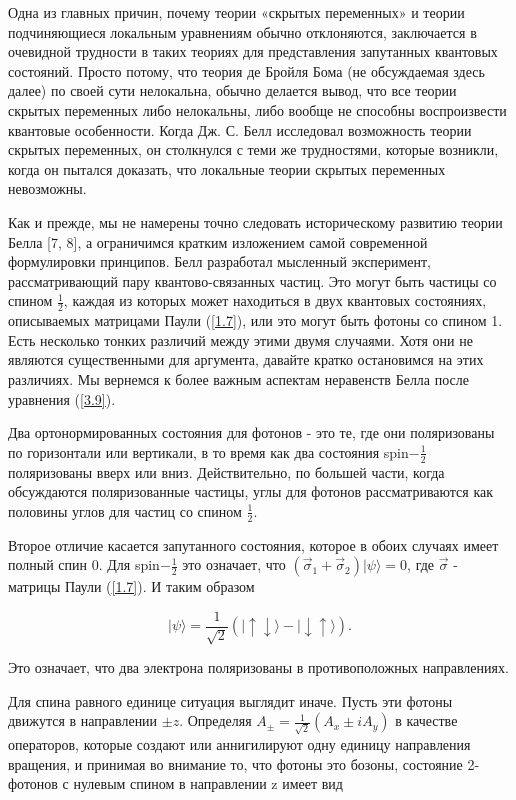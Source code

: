 \documentclass[main.tex]{subfiles}
\begin{document}
Одна из главных причин, почему теории «скрытых переменных» и теории подчиняющиеся локальным уравнениям обычно отклоняются, заключается в очевидной трудности в таких теориях для представления запутанных квантовых состояний. Просто потому, что теория де Бройля Бома (не обсуждаемая здесь далее) по своей сути нелокальна, обычно делается вывод, что все теории скрытых переменных либо нелокальны, либо вообще не способны воспроизвести квантовые особенности. Когда Дж. С. Белл исследовал возможность теории скрытых переменных, он столкнулся с теми же трудностями, которые возникли, когда он пытался доказать, что локальные теории скрытых переменных невозможны.

Как и прежде, мы не намерены точно следовать историческому развитию теории Белла [7, 8], а ограничимся кратким изложением самой современной формулировки принципов. Белл разработал мысленный эксперимент, рассматривающий пару квантово-связанных частиц. Это могут быть частицы со спином $\frac 1 2$, каждая из которых может находиться в двух квантовых состояниях, описываемых матрицами Паули (\ref{1.7}), или это могут быть фотоны со спином 1. Есть несколько тонких различий между этими двумя случаями. Хотя они не являются существенными для аргумента, давайте кратко остановимся на этих различиях. Мы вернемся к более важным аспектам неравенств Белла после уравнения (\ref{3.9}).

Два ортонормированных состояния для фотонов - это те, где они поляризованы по горизонтали или вертикали, в то время как два состояния spin$-\frac 1 2$ поляризованы вверх или вниз. Действительно, по большей части, когда обсуждаются поляризованные частицы, углы для фотонов рассматриваются как половины углов для частиц со спином $\frac 1 2$.

Второе отличие касается запутанного состояния, которое в обоих случаях имеет полный спин 0. Для spin$-\frac 1 2$ это означает, что $(\vec\sigma_1 + \vec\sigma_2)|\psi\rangle = 0$, где $\vec\sigma$ - матрицы Паули (\ref{1.7}). И таким образом 

\begin{equation}\label{3.6}
	|\psi\rangle=\frac{1}{\sqrt{2}}(|\uparrow \downarrow\rangle-|\downarrow \uparrow\rangle).
\end{equation}

Это означает, что два электрона поляризованы в противоположных направлениях.

Для спина равного единице ситуация выглядит иначе. Пусть эти фотоны движутся в направлении $\pm z$. Определяя $A_\pm = \frac 1 {\sqrt 2} (A_x \pm iA_y)$ в качестве операторов, которые создают или аннигилируют одну единицу направления вращения, и принимая во внимание то, что фотоны это бозоны, состояние 2-фотонов с нулевым спином в направлении z имеет вид
\end{document}
